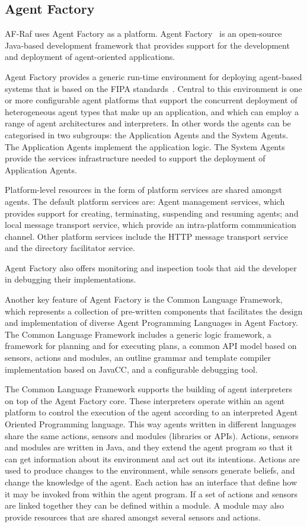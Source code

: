 \documentclass[a4paper,12pt,oneside,fleqn]{book} %
\begin{document}
\subsection{Agent Factory} %

AF-Raf uses Agent Factory as a platform. Agent
Factory~\cite{collier2002agent} is an open-source Java-based development
framework that provides support for the development and deployment of
agent-oriented applications.

Agent Factory provides a generic run-time environment for deploying
agent-based systems that is based on the FIPA
standards~\cite{poslad2000fipa}.  Central to this environment is one or
more configurable agent platforms that support the concurrent deployment of
heterogeneous agent types that make up an application, and which can employ
a range of agent architectures and interpreters. In other words the agents
can be categorised in two subgroups: the Application Agents and the System
Agents. The Application Agents implement the application logic. The System
Agents provide the services infrastructure needed to support the deployment
of Application Agents.

Platform-level resources in the form of platform services are shared
amongst agents. The default platform services are: Agent management
services, which provides support for creating, terminating, suspending and
resuming agents; and local message transport service, which provide an
intra-platform communication channel. Other platform services include the
HTTP message transport service and the directory facilitator service.

Agent Factory also offers monitoring and inspection tools that aid the
developer in debugging their implementations.

Another key feature of Agent Factory is the Common Language Framework,
which represents a collection of pre-written components that facilitates
the design and implementation of diverse Agent Programming Languages in
Agent Factory\null. The Common Language Framework includes a generic logic
framework, a framework for planning and for executing plans, a common API
model based on sensors, actions and modules, an outline grammar and
template compiler implementation based on JavaCC, and a configurable
debugging tool.

The Common Language Framework supports the building of agent interpreters
on top of the Agent Factory core. These interpreters operate within an
agent platform to control the execution of the agent according to an
interpreted Agent Oriented Programming language. This way agents written in
different languages share the same actions, sensors and modules (libraries
or APIs). Actions, sensors and modules are written in Java, and they extend
the agent program so that it can get information about its environment and
act out its intentions. Actions are used to produce changes to the
environment, while sensors generate beliefs, and change the knowledge of
the agent. Each action has an interface that define how it may be invoked
from within the agent program. If a set of actions and sensors are linked
together they can be defined within a module. A module may also provide
resources that are shared amongst several sensors and actions.
\end{document}
